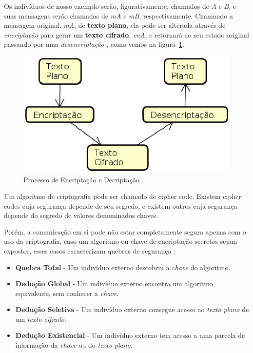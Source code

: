 	Os indivíduos de nosso exemplo serão, figurativamente, chamados de \textit{A} e \textit{B}, e suas mensagens serão chamadas de \textit{mA} e \textit{mB}, respectivamente. Chamando a mensagem original, \textit{mA}, de \textbf{texto plano}, ela pode ser alterada através de \textit{encriptação} para gerar um \textbf{texto cifrado}, \textit{enA}, e retornará ao seu estado original passando por uma \textit{desencriptação} \cite[p.~15]{schneier96}, como vemos na figura~\ref{fig:img01}.

	\begin{figure}[h]
		\centering
		\includegraphics[keepaspectratio=true,scale=0.5]{figuras/proc.eps}
		\caption{Processo de Encriptação e Decriptação}
		\label{fig:img01}
	\end{figure}

	Um algoritmo de criptografia pode ser chamado de cipher code. Existem cipher codes cuja segurança depende de seu segredo, e existem outros cuja segurança depende do segredo de valores denominados chaves.
	
	Porém, a comunicação em si pode não estar completamente segura apenas com o uso da criptografia, caso um algoritmo ou chave de encriptação secretos sejam expostos, esses casos caracterizam quebras de segurança \cite[p.~399]{stallings11}:
	
	\begin{itemize}
		\item \textbf{Quebra Total} - Um indivíduo externo descobriu a \textit{chave} do algoritmo.
		\item \textbf{Dedução Global} - Um indivíduo externo encontra um algoritmo equivalente, sem conhecer a \textit{chave}.
		\item \textbf{Dedução Seletiva} - Um indivíduo externo consegue acesso ao \textit{texto plano} de um \textit{texto cifrado}.
		\item \textbf{Dedução Existencial} - Um indivíduo externo tem acesso a uma parcela de informação da \textit{chave} ou do \textit{texto plano}. 
	\end{itemize}

